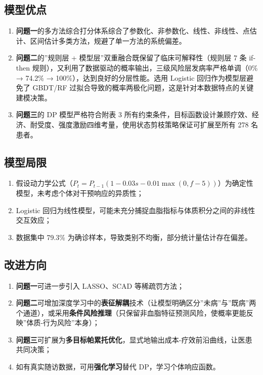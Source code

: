 \documentclass{MathorCupmodeling}
\providecommand{\tightlist}{%
  \setlength{\itemsep}{0pt}\setlength{\parskip}{0pt}}
\begin{document}
\subsection{模型优点}\label{ux6a21ux578bux4f18ux70b9}

\begin{enumerate}
\def\labelenumi{\arabic{enumi}.}
\tightlist
\item
  \textbf{问题一}的多方法综合打分体系综合了参数化、非参数化、线性、非线性、点估计、区间估计多类方法，规避了单一方法的系统偏差。
\item
  \textbf{问题二}的''规则层 + 模型层''双重融合既保留了临床可解释性（规则层 7 条 if-then 规则），又利用了数据驱动的概率输出，三级风险层发病率严格单调（0\% → 74.2\% → 100\%），达到良好的分层性能。选用 Logistic 回归作为模型层避免了 GBDT/RF 过拟合导致的概率两极化问题，这是针对本数据特点的关键建模决策。
\item
  \textbf{问题三}的 DP 模型严格符合附表 3 所有约束条件，目标函数设计兼顾疗效、经济、耐受度、强度激励四维考量，使用状态剪枝策略保证可扩展至所有 278 名患者。
\end{enumerate}

\subsection{模型局限}\label{ux6a21ux578bux5c40ux9650}

\begin{enumerate}
\def\labelenumi{\arabic{enumi}.}
\tightlist
\item
  假设动力学公式（\(P_t = P_{t-1}(1 - 0.03 s - 0.01 \max(0, f - 5))\)）为确定性模型，未考虑个体对干预响应的异质性；
\item
  Logistic 回归为线性模型，可能未充分捕捉血脂指标与体质积分之间的非线性交互效应；
\item
  数据集中 79.3\% 为确诊样本，导致类别不均衡，部分统计量估计存在偏差。
\end{enumerate}

\subsection{改进方向}\label{ux6539ux8fdbux65b9ux5411}

\begin{enumerate}
\def\labelenumi{\arabic{enumi}.}
\tightlist
\item
  \textbf{问题一}可进一步引入 LASSO、SCAD 等稀疏罚方法；
\item
  \textbf{问题二}可增加深度学习中的\textbf{表征解耦}技术（让模型明确区分''未病''与''既病''两个通道），或采用\textbf{条件风险推理}（只保留非血脂特征预测风险，使概率更能反映''体质-行为风险''本身）；
\item
  \textbf{问题三}可扩展为\textbf{多目标帕累托优化}，显式地输出成本-疗效前沿曲线，让医患共同决策；
\item
  如有真实随访数据，可用\textbf{强化学习}替代 DP，学习个体响应函数。
\end{enumerate}
\end{document}
